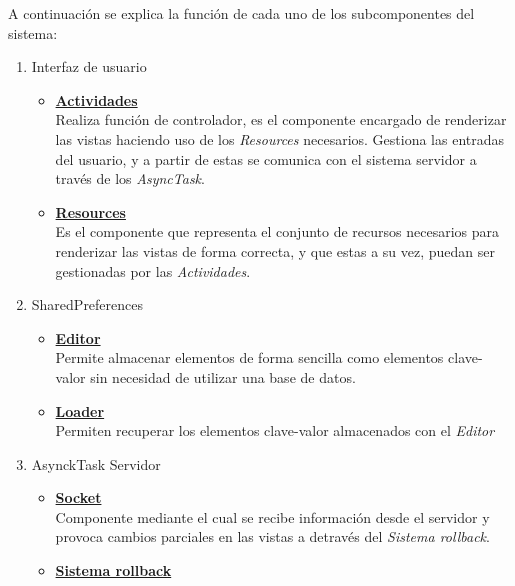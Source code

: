             A continuación se explica la función de cada uno de los subcomponentes del sistema:

            \begin{enumerate}
                \item Interfaz de usuario
                    \begin{itemize}
                        \item \textbf{\underline{Actividades}} \\
                            Realiza función de controlador, es el componente encargado de renderizar las vistas haciendo uso de los \textit{Resources} necesarios. Gestiona las entradas del usuario, y a partir de estas se comunica con el sistema servidor a través de los \textit{AsyncTask}.
                        \item \textbf{\underline{Resources}} \\ 
                            Es el componente que representa el conjunto de recursos necesarios para renderizar las vistas de forma correcta, y que estas a su vez, puedan ser gestionadas por las \textit{Actividades}.
                    \end{itemize}
                \item SharedPreferences
                    \begin{itemize}
                        \item \textbf{\underline{Editor}} \\ 
                            Permite almacenar elementos de forma sencilla como elementos clave-valor sin necesidad de utilizar una base de datos.
                        \item \textbf{\underline{Loader}} \\
                            Permiten recuperar los elementos clave-valor almacenados con el \textit{Editor}
                    \end{itemize}
                \item AsynckTask Servidor
                    \begin{itemize}
                        \item \textbf{\underline{Socket}} \\ 
                            Componente mediante el cual se recibe información desde el servidor y provoca cambios parciales en las vistas a detravés del \textit{Sistema rollback}.
                        \item \textbf{\underline{Sistema rollback}} \\

\end{itemize}
\end{enumerate}
